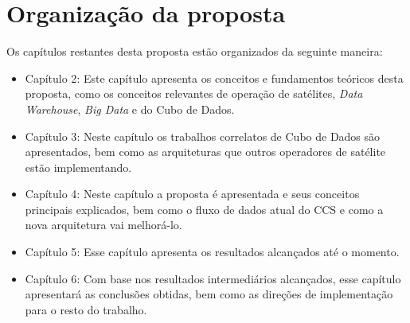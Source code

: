 \section{Organização da proposta}\label{ch:intro:org}

Os capítulos restantes desta proposta estão organizados da seguinte maneira:

\begin{itemize}
	\item{Capítulo 2}: Este capítulo apresenta os conceitos e fundamentos teóricos desta proposta, como os conceitos relevantes de operação de satélites, \textit{Data Warehouse}, \textit{Big Data} e do Cubo de Dados.
	\item{Capítulo 3}: Neste capítulo os trabalhos correlatos de Cubo de Dados são apresentados, bem como as arquiteturas que outros operadores de satélite estão implementando.
	\item{Capítulo 4}: {\color{red} Neste capítulo a proposta é apresentada e seus conceitos principais explicados, bem como o fluxo de dados atual do CCS e como a nova arquitetura vai melhorá-lo.}
	\item{Capítulo 5}: Esse capítulo apresenta os resultados alcançados até o momento.
	\item{Capítulo 6}: Com base nos resultados intermediários alcançados, esse capítulo apresentará as conclusões obtidas, bem como as direções de implementação para o resto do trabalho.
\end{itemize}

